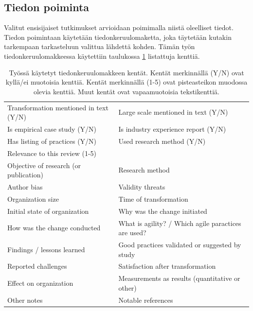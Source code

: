 \subsection{Tiedon poiminta}

Valitut ensisijaiset tutkimukset arvioidaan poimimalla niistä oleelliset tiedot.
Tiedon poimintaan käytetään tiedonkeruulomaketta, joka täytetään kutakin
tarkempaan tarkasteluun valittua lähdettä kohden. Tämän työn
tiedonkeruulomakkeessa käytettiin taulukossa \ref{table:dataform} listattuja
kenttiä.

\begin{table}
    \begin{tabular}{| l | p{7.64cm} |}
        \hline
        Transformation mentioned in text (Y/N) &
        Large scale mentioned in text (Y/N) \\
        Is empirical case study (Y/N) &
        Is industry experience report (Y/N) \\
        Has listing of practices (Y/N) &
        Used research method (Y/N) \\
        Relevance to this review (1-5) & \\
        Objective of research (or publication) &
        Research method \\
        Author bias &
        Validity threats \\
        Organization size &
        Time of transformation \\
        Initial state of organization &
        Why was the change initiated \\
        How was the change conducted &
        What is agility? / Which agile paractices are used? \\
        Findings / lessons learned &
        Good practices validated or suggested by study \\
        Reported challenges &
        Satisfaction after transformation \\
        Effect on organization &
        Measurements as results (quantitative or other) \\
        Other notes &
        Notable references \\
        \hline
    \end{tabular}
    \caption{Työssä käytetyt tiedonkeruulomakkeen kentät. Kentät merkinnällä
    (Y/N) ovat kyllä/ei muotoisia kenttiä. Kentät merkinnällä (1-5) ovat
    pisteasteikon muodossa olevia kenttiä. Muut kentät ovat vapaamuotoisia
    tekstikenttiä.}
    \label{table:dataform}
\end{table}


